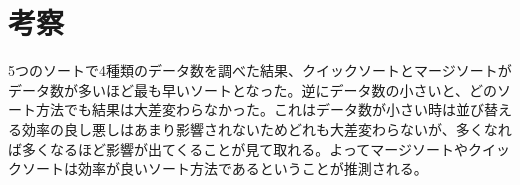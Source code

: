 \documentclass[a4j,titlepage]{jarticle}
\begin{document}
\section{考察}
5つのソートで4種類のデータ数を調べた結果、クイックソートとマージソートがデータ数が多いほど最も早いソートとなった。逆にデータ数の小さいと、どのソート方法でも結果は大差変わらなかった。これはデータ数が小さい時は並び替える効率の良し悪しはあまり影響されないためどれも大差変わらないが、多くなれば多くなるほど影響が出てくることが見て取れる。よってマージソートやクイックソートは効率が良いソート方法であるということが推測される。
 

\end{document}
